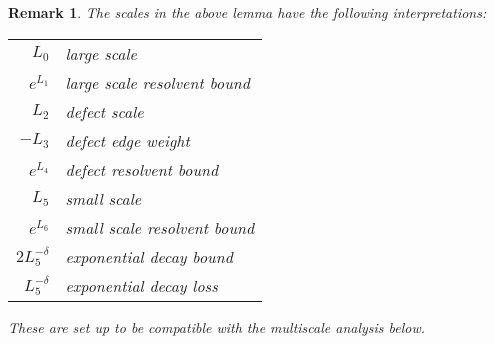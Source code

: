 \documentclass{amsart}
\newtheorem{remark}[equation]{Remark}
\numberwithin{equation}{section}
\numberwithin{figure}{section}
\begin{document}
\begin{remark}
The scales in the above lemma have the following interpretations:
\begin{center}
\begin{tabular}{rl}
$L_0$ & large scale \\
$e^{L_1}$ & large scale resolvent bound \\
$L_2$ & defect scale \\
$-L_3$ & defect edge weight \\
$e^{L_4}$ & defect resolvent bound \\
$L_5$ & small scale \\
$e^{L_6}$ & small scale resolvent bound \\
$2L_5^{-\delta}$ & exponential decay bound \\
$L_5^{-\delta}$ & exponential decay loss \\
\end{tabular}
\end{center}
These are set up to be compatible with the multiscale analysis below.
\end{remark}
\end{document}
